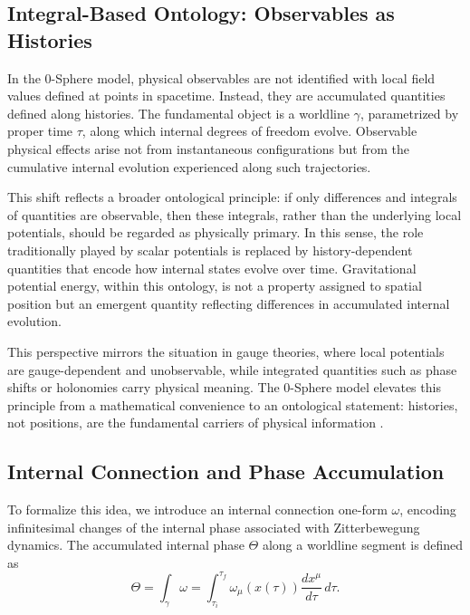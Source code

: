 \documentclass[%
 reprint,
 amsmath,amssymb,
 aps,
 prb,
]{revtex4-2}
\numberwithin{equation}{section}
\begin{document}
\subsection{Integral-Based Ontology: Observables as Histories}

In the 0-Sphere model, physical observables are not identified with local field values defined at points in spacetime. Instead, they are accumulated quantities defined along histories. The fundamental object is a worldline $\gamma$, parametrized by proper time $\tau$, along which internal degrees of freedom evolve. Observable physical effects arise not from instantaneous configurations but from the cumulative internal evolution experienced along such trajectories.

This shift reflects a broader ontological principle: if only differences and integrals of quantities are observable, then these integrals, rather than the underlying local potentials, should be regarded as physically primary. In this sense, the role traditionally played by scalar potentials is replaced by history-dependent quantities that encode how internal states evolve over time. Gravitational potential energy, within this ontology, is not a property assigned to spatial position but an emergent quantity reflecting differences in accumulated internal evolution.

This perspective mirrors the situation in gauge theories, where local potentials are gauge-dependent and unobservable, while integrated quantities such as phase shifts or holonomies carry physical meaning. The 0-Sphere model elevates this principle from a mathematical convenience to an ontological statement: histories, not positions, are the fundamental carriers of physical information \cite{Hanamura2026LineIntegrals}.

\subsection{Internal Connection and Phase Accumulation}

To formalize this idea, we introduce an internal connection one-form $\omega$, encoding infinitesimal changes of the internal phase associated with Zitterbewegung dynamics. The accumulated internal phase $\Theta$ along a worldline segment is defined as
\begin{equation}
\Theta = \int_{\gamma} \omega
       = \int_{\tau_i}^{\tau_f} \omega_\mu(x(\tau)) 
         \frac{dx^\mu}{d\tau} \, d\tau .
\label{eq:phase_integral}
\end{equation}
\end{document}
